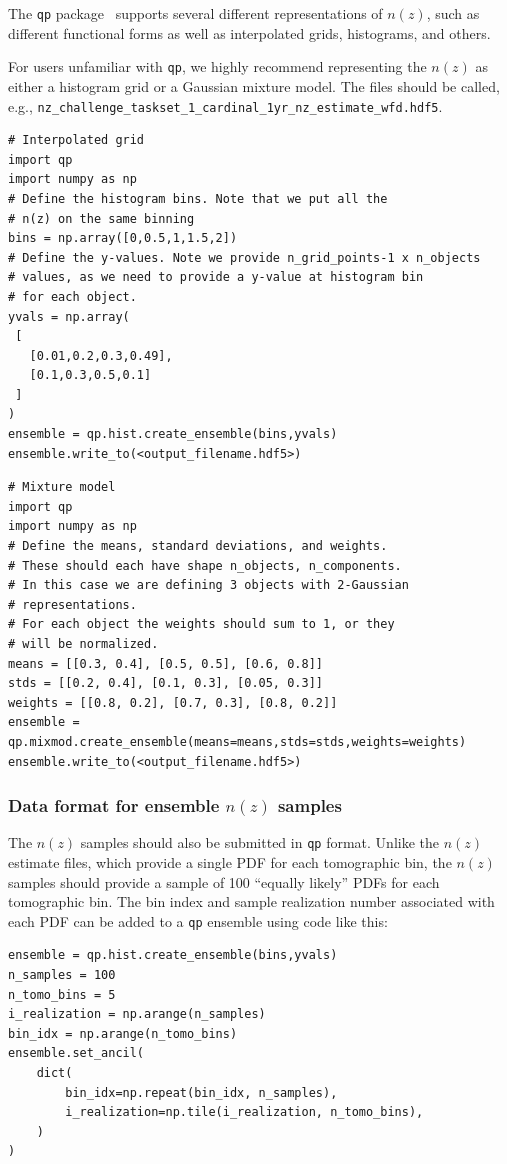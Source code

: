 \documentclass[11pt,twoside,letterpaper,onecolumn,english]{article}
\begin{document}
The \texttt{qp} package~\cite{QP} supports several different representations of
$n(z)$, such as different functional forms as well as interpolated
grids, histograms, and others.

For users unfamiliar with \texttt{qp}, we highly recommend representing
the $n(z)$ as either a histogram grid or a Gaussian mixture model.
The files should be called, e.g., \texttt{nz\_challenge\_taskset\_1\_cardinal\_1yr\_nz\_estimate\_wfd.hdf5}.

\begin{verbatim}
# Interpolated grid
import qp
import numpy as np
# Define the histogram bins. Note that we put all the
# n(z) on the same binning
bins = np.array([0,0.5,1,1.5,2])
# Define the y-values. Note we provide n_grid_points-1 x n_objects 
# values, as we need to provide a y-value at histogram bin 
# for each object.
yvals = np.array(
 [
   [0.01,0.2,0.3,0.49],
   [0.1,0.3,0.5,0.1]
 ]
)
ensemble = qp.hist.create_ensemble(bins,yvals)
ensemble.write_to(<output_filename.hdf5>)
\end{verbatim}

\begin{verbatim}
# Mixture model
import qp
import numpy as np
# Define the means, standard deviations, and weights.
# These should each have shape n_objects, n_components.
# In this case we are defining 3 objects with 2-Gaussian 
# representations.
# For each object the weights should sum to 1, or they
# will be normalized.
means = [[0.3, 0.4], [0.5, 0.5], [0.6, 0.8]]
stds = [[0.2, 0.4], [0.1, 0.3], [0.05, 0.3]]
weights = [[0.8, 0.2], [0.7, 0.3], [0.8, 0.2]]
ensemble = qp.mixmod.create_ensemble(means=means,stds=stds,weights=weights)
ensemble.write_to(<output_filename.hdf5>)
\end{verbatim}


\subsubsection{\texorpdfstring{Data format for ensemble  $n(z)$ samples}{Data format for ensemble n(z) samples}}

The $n(z)$ samples should also be submitted in \texttt{qp} format.  Unlike the
$n(z)$ estimate files, which provide a single PDF for each tomographic bin,
the $n(z)$ samples should provide a sample of 100 ``equally likely'' PDFs for
each tomographic bin.  The bin index and sample realization number associated with each
PDF can be added to a \texttt{qp} ensemble using code like this:

\begin{verbatim}
ensemble = qp.hist.create_ensemble(bins,yvals)
n_samples = 100
n_tomo_bins = 5
i_realization = np.arange(n_samples)
bin_idx = np.arange(n_tomo_bins)
ensemble.set_ancil(
    dict(
        bin_idx=np.repeat(bin_idx, n_samples),
        i_realization=np.tile(i_realization, n_tomo_bins),
    )
)
\end{verbatim}
\end{document}
